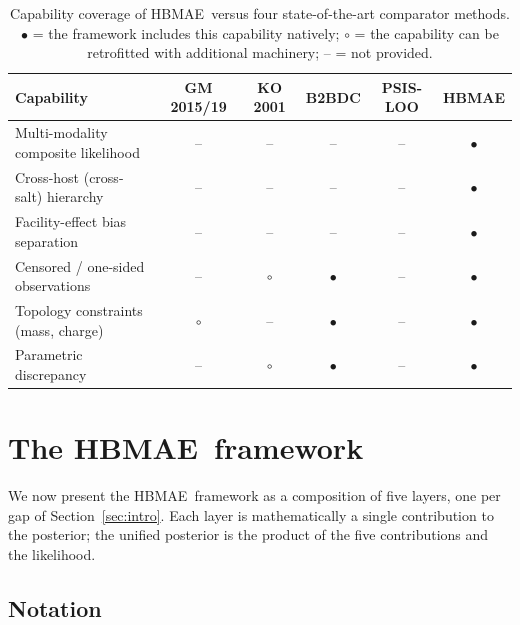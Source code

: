 \documentclass[12pt]{article}
\theoremstyle{plain}
\theoremstyle{definition}
\theoremstyle{remark}
\newcommand{\HBMAE}{HBMAE\xspace}
\begin{document}
\begin{table}[ht]\centering
\caption{Capability coverage of \HBMAE\ versus four state-of-the-art
comparator methods.  $\bullet$ = the framework includes this capability
natively; $\circ$ = the capability can be retrofitted with additional
machinery; -- = not provided.}
\label{tab:sota_capabilities}
\small
\setlength{\tabcolsep}{3pt}
\begin{tabular}{lccccc}
\toprule
Capability & GM 2015/19 & KO 2001 & B2BDC & PSIS-LOO & \HBMAE \\
\midrule
Multi-modality composite likelihood & --      & --      & --      & --      & $\bullet$ \\
Cross-host (cross-salt) hierarchy   & --      & --      & --      & --      & $\bullet$ \\
Facility-effect bias separation     & --      & --      & --      & --      & $\bullet$ \\
Censored / one-sided observations   & --      & $\circ$ & $\bullet$ & --     & $\bullet$ \\
Topology constraints (mass, charge) & $\circ$ & --      & $\bullet$ & --     & $\bullet$ \\
Parametric discrepancy              & --      & $\circ$ & $\bullet$ & --     & $\bullet$ \\
\bottomrule
\end{tabular}
\end{table}

\section{The \HBMAE\ framework}\label{sec:framework}

We now present the \HBMAE\ framework as a composition of five layers, one
per gap of Section~\ref{sec:intro}.  Each layer is mathematically a single
contribution to the posterior; the unified posterior is the product
of the five contributions and the likelihood.

\subsection{Notation}\label{sec:framework:notation}
\end{document}
